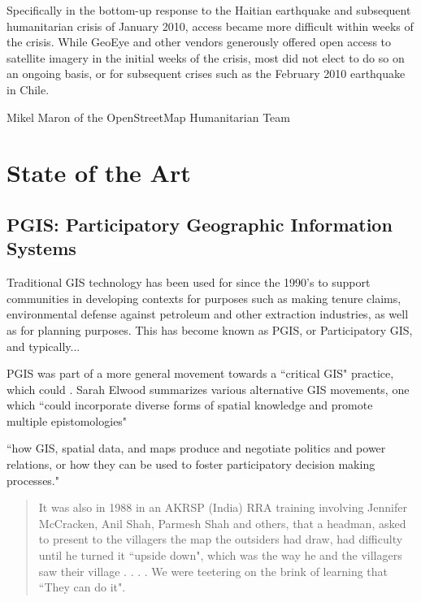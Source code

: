 \documentclass[11pt]{report}
\begin{document}
Specifically in the bottom-up response to the Haitian earthquake and subsequent humanitarian crisis of January 2010, access became more difficult within weeks of the crisis. While GeoEye and other vendors generously offered open access to satellite imagery in the initial weeks of the crisis, most did not elect to do so on an ongoing basis, or for subsequent crises such as the February 2010 earthquake in Chile.





Mikel Maron of the OpenStreetMap Humanitarian Team 


\chapter{State of the Art}
\section{PGIS: Participatory Geographic Information Systems}

Traditional GIS technology has been used for since the 1990's to support communities in developing contexts for purposes such as making tenure claims, environmental defense against petroleum and other extraction industries, as well as for planning purposes. This has become known as PGIS, or Participatory GIS, and typically... 




PGIS was part of a more general movement towards a ``critical GIS" practice, which could . Sarah Elwood summarizes various alternative GIS movements, one which ``could incorporate diverse forms of spatial knowledge and promote multiple epistomologies" \cite{elwood2009representations}

``how GIS, spatial data, and maps produce and negotiate politics and power relations, or how they can be used to foster participatory decision making processes."

\begin{quote}
It was also in 1988 in an AKRSP (India) RRA training involving Jennifer McCracken, Anil Shah, Parmesh Shah and others, that a headman, asked to present to the villagers the map the outsiders had draw, had difficulty until he turned it ``upside down", which was the way he and the villagers saw their village . . . . We were teetering on the brink of learning that ``They can do it".
\cite{chambers2006participatory}
\end{quote}
\end{document}
